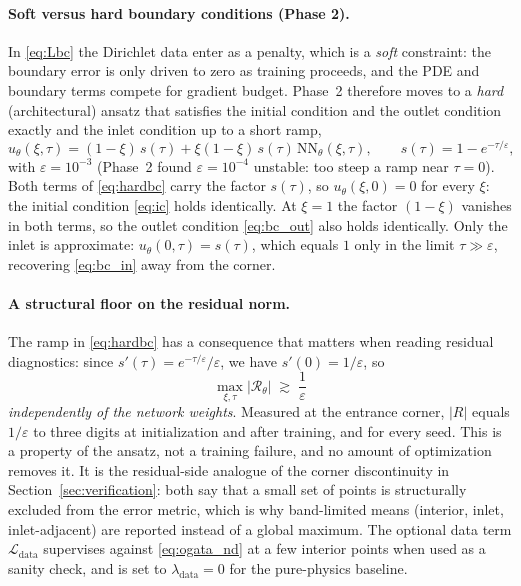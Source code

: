 \documentclass[11pt]{article}
\newcommand{\Ldata}{\mathcal{L}_{\mathrm{data}}}
\begin{document}
\paragraph{Soft versus hard boundary conditions (Phase 2).}
In \eqref{eq:Lbc} the Dirichlet data enter as a penalty, which is a \emph{soft}
constraint: the boundary error is only driven to zero as training proceeds, and
the PDE and boundary terms compete for gradient budget. Phase~2 therefore moves
to a \emph{hard} (architectural) ansatz that satisfies the initial condition and
the outlet condition exactly and the inlet condition up to a short ramp,
\begin{equation}
\label{eq:hardbc}
u_\theta(\xi,\tau)=(1-\xi)\,s(\tau)
+\xi(1-\xi)\,s(\tau)\,\mathrm{NN}_\theta(\xi,\tau),
\qquad s(\tau)=1-e^{-\tau/\varepsilon},
\end{equation}
with $\varepsilon=10^{-3}$ (Phase~2 found $\varepsilon=10^{-4}$ unstable: too
steep a ramp near $\tau=0$). Both terms of \eqref{eq:hardbc} carry the factor
$s(\tau)$, so $u_\theta(\xi,0)=0$ for every $\xi$: the initial condition
\eqref{eq:ic} holds identically. At $\xi=1$ the factor $(1-\xi)$ vanishes in both
terms, so the outlet condition \eqref{eq:bc_out} also holds identically. Only the
inlet is approximate: $u_\theta(0,\tau)=s(\tau)$, which equals $1$ only in the
limit $\tau\gg\varepsilon$, recovering \eqref{eq:bc_in} away from the corner.

\paragraph{A structural floor on the residual norm.}
The ramp in \eqref{eq:hardbc} has a consequence that matters when reading
residual diagnostics: since $s'(\tau)=e^{-\tau/\varepsilon}/\varepsilon$, we
have $s'(0)=1/\varepsilon$, so
\begin{equation}
\label{eq:residual_floor}
\max_{\xi,\tau}\bigl|\mathcal{R}_\theta\bigr|
\;\gtrsim\;\frac{1}{\varepsilon}
\end{equation}
\emph{independently of the network weights}. Measured at the entrance corner,
$|R|$ equals $1/\varepsilon$ to three digits at initialization and after
training, and for every seed. This is a property of the ansatz, not a training
failure, and no amount of optimization removes it. It is the residual-side
analogue of the corner discontinuity in Section~\ref{sec:verification}: both say
that a small set of points is structurally excluded from the error metric, which
is why band-limited means (interior, inlet, inlet-adjacent) are reported
instead of a global maximum. The optional data term $\Ldata$ supervises against
\eqref{eq:ogata_nd} at a few interior points when used as a sanity check, and is
set to $\lambda_{\mathrm{data}}=0$ for the pure-physics baseline.
\end{document}
